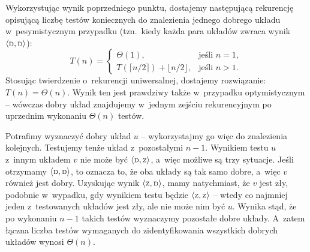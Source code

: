 \subproblem %
Wykorzystując wynik poprzedniego punktu, dostajemy następującą rekurencję opisującą liczbę testów koniecznych do znalezienia jednego dobrego układu w~pesymistycznym przypadku (tzn.\ kiedy każda para układów zwraca wynik $\langle{\scriptstyle\rm D},{\scriptstyle\rm D}\rangle$):
\[
	T(n) =
	\begin{cases}
		\Theta(1), & \text{jeśli $n=1$}, \\
		T(\lceil n/2\rceil)+\lfloor n/2\rfloor, & \text{jeśli $n>1$}.
	\end{cases}
\]
Stosując twierdzenie o~rekurencji uniwersalnej, dostajemy rozwiązanie: $T(n)=\Theta(n)$.
Wynik ten jest prawdziwy także w~przypadku optymistycznym -- wówczas dobry układ znajdujemy w~jednym zejściu rekurencyjnym po uprzednim wykonaniu $\Theta(n)$ testów.

Potrafimy wyznaczyć dobry układ $u$ -- wykorzystajmy go więc do znalezienia kolejnych.
Testujemy tenże układ z~pozostałymi $n-1$.
Wynikiem testu $u$ z~innym układem $v$ nie może być $\langle{\scriptstyle\rm D},{\scriptstyle\rm Z}\rangle$, a~więc możliwe są trzy sytuacje.
Jeśli otrzymamy $\langle{\scriptstyle\rm D},{\scriptstyle\rm D}\rangle$, to oznacza to, że oba układy są tak samo dobre, a~więc $v$ również jest dobry.
Uzyskując wynik $\langle{\scriptstyle\rm Z},{\scriptstyle\rm D}\rangle$, mamy natychmiast, że $v$ jest zły, podobnie w~wypadku, gdy wynikiem testu będzie $\langle{\scriptstyle\rm Z},{\scriptstyle\rm Z}\rangle$ -- wtedy co najmniej jeden z~testowanych układów jest zły, ale nie może nim być $u$.
Wynika stąd, że po wykonaniu $n-1$ takich testów wyznaczymy pozostałe dobre układy.
A~zatem łączna liczba testów wymaganych do zidentyfikowania wszystkich dobrych układów wynosi $\Theta(n)$.
